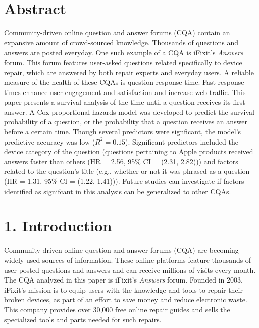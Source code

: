 \documentclass{article}
\begin{document}


\makeatletter
\DeclareRobustCommand\bfseries{%
  \not@math@alphabet\bfseries\mathbf
  \fontseries\bfdefault\selectfont
  \boldmath %
}
\makeatother



\section*{Abstract}

Community-driven online question and answer forums (CQA) contain an expansive amount of crowd-sourced knowledge. Thousands of questions and answers are posted everyday. One such example of a CQA is iFixit's \textit{Answers} forum. This forum features user-asked questions related specifically to device repair, which are answered by both repair experts and everyday users. A reliable measure of the health of these CQAs is question response time. Fast response times enhance user engagement and satisfaction and increase web traffic. This paper presents a survival analysis of the time until a question receives its first answer. A Cox proportional hazards model was developed to predict the survival probability of a question, or the probability that a question receives an answer before a certain time. Though several predictors were signficant, the model's predictive accuracy was low ($R^2 = 0.15$). Significant predictors included the device category of the question (questions pertaining to Apple products received answers faster than others (HR = 2.56, 95\% CI = (2.31, 2.82))) and factors related to the question's title (e.g., whether or not it was phrased as a question (HR = 1.31, 95\% CI = (1.22, 1.41))). Future studies can investigate if factors identified as signifcant in this analysis can be generalized to other CQAs. 


\section*{1. Introduction}

Community-driven online question and answer forums (CQA) are becoming widely-used sources of information. These online platforms feature thousands of user-posted questions and answers and can receive millions of visits every month. The CQA analyzed in this paper is iFixit's \textit{Answers} forum. Founded in 2003, iFixit's mission is to equip users with the knowledge and tools to repair their broken devices, as part of an effort to save money and reduce electronic waste. This company provides over 30,000 free online repair guides and sells the specialized tools and parts needed for such repairs.
    
\end{document}
